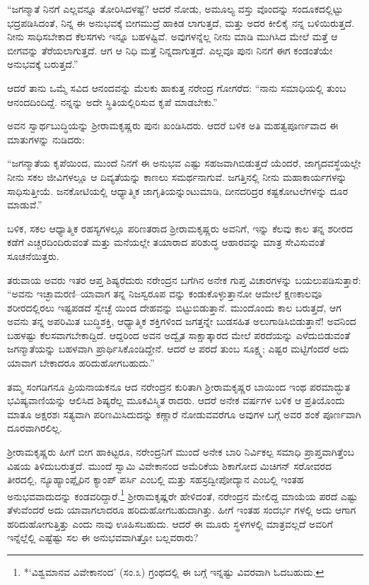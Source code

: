 “ಜಗನ್ಮಾತೆ ನಿನಗೆ ಎಲ್ಲವನ್ನೂ ತೋರಿಸಿದಳಷ್ಟೆ? ಆದರೆ ನೋಡು, ಅಮೂಲ್ಯ ವಸ್ತು ವೊಂದನ್ನು ಸಂದೂಕದಲ್ಲಿಟ್ಟು ಭದ್ರಪಡಿಸಿದಂತೆ, ನಿನ್ನ ಈ ಅನುಭವಕ್ಕೆ ಬೀಗಮುದ್ರೆ ಹಾಕಿಡ ಲಾಗುತ್ತದೆ, ಮತ್ತು ಅದರ ಕೀಲಿಕೈ ನನ್ನ ಬಳಿಯಿರುತ್ತದೆ. ನೀನು ಸಾಧಿಸಬೇಕಾದ ಕೆಲಸಗಳು ಇನ್ನೂ ಬಹಳಷ್ಟಿವೆ. ಅವುಗಳನ್ನೆಲ್ಲ ನೀನು ಮಾಡಿ ಮುಗಿಸಿದ ಮೇಲೆ ಮತ್ತೆ ಆ ಬೀಗವನ್ನು ತೆರೆಯಲಾಗುತ್ತದೆ. ಆಗ ಆ ನಿಧಿ ಮತ್ತೆ ನಿನ್ನದಾಗುತ್ತದೆ. ಎಲ್ಲವೂ ಪುನಃ ನಿನಗೆ ಈಗ ಕಂಡಂತೆಯೇ ಅನುಭವಕ್ಕೆ ಬರುತ್ತದೆ.”

ಆದರೆ ತಾನು ಒಮ್ಮೆ ಸವಿದ ಆನಂದವನ್ನು ಮೆಲಕು ಹಾಕುತ್ತ ನರೇಂದ್ರ ಗೋಗರೆದ: “ನಾನು ಸಮಾಧಿಯಲ್ಲಿ ತುಂಬ ಆನಂದದಿಂದಿದ್ದೆ. ನನ್ನನ್ನು ಅದೇ ಸ್ಥಿತಿಯಲ್ಲಿರಿಸುವ ಕೃಪೆ ಮಾಡಬೇಕು.”

ಅವನ ಸ್ವಾರ್ಥಬುದ್ಧಿಯನ್ನು ಶ್ರೀರಾಮಕೃಷ್ಣರು ಪುನಃ ಖಂಡಿಸಿದರು. ಆದರೆ ಬಳಿಕ ಅತಿ ಮಹತ್ವಪೂರ್ಣವಾದ ಈ ಮಾತುಗಳನ್ನು ನುಡಿದರು:

“ಜಗನ್ಮಾತೆಯ ಕೃಪೆಯಿಂದ, ಮುಂದೆ ನಿನಗೆ ಈ ಅನುಭವ ಎಷ್ಟು ಸಹಜವಾಗಿಬಿಡುತ್ತದೆ ಯೆಂದರೆ, ಜಾಗೃದವಸ್ಥೆಯಲ್ಲೇ ನೀನು ಸಕಲ ಜೀವಿಗಳಲ್ಲೂ ಆ ದಿವ್ಯತೆಯನ್ನು ಕಾಣಲು ಸಮರ್ಥನಾಗುವೆ. ಜಗತ್ತಿನಲ್ಲಿ ನೀನು ಮಹಾಕಾರ್ಯಗಳನ್ನು ಸಾಧಿಸುತ್ತೀಯೆ. ಜನಕೋಟಿಯಲ್ಲಿ ಆಧ್ಯಾತ್ಮಿಕ ಜಾಗೃತಿಯನ್ನುಂಟುಮಾಡಿ, ದೀನದರಿದ್ರರ ಕಷ್ಟಕೋಟಲೆಗಳನ್ನು ದೂರ ಮಾಡುವೆ.”

ಬಳಿಕ, ಸಕಲ ಆಧ್ಯಾತ್ಮಿಕ ರಹಸ್ಯಗಳಲ್ಲೂ ಪರಿಣತರಾದ ಶ್ರೀರಾಮಕೃಷ್ಣರು ಅವನಿಗೆ, ಇನ್ನು ಕೆಲವು ಕಾಲ ತನ್ನ ಶರೀರದ ಕಡೆಗೆ ಎಚ್ಚರದಿಂದಿರುವಂತೆ ಮತ್ತು ಮನೆಯಲ್ಲೇ ತಯಾರಾದ ಪರಿಶುದ್ಧ ಆಹಾರವನ್ನು ಮಾತ್ರ ಸೇವಿಸುವಂತೆ ಸೂಚನೆಯಿತ್ತರು.

ತರುವಾಯ ಅವರು ಇತರ ಆಪ್ತ ಶಿಷ್ಯರೆದುರು ನರೇಂದ್ರನ ಬಗೆಗಿನ ಅನೇಕ ಗುಪ್ತ ವಿಚಾರಗಳನ್ನು ಬಯಲುಪಡಿಸುತ್ತಾರೆ: “ಅವನು ಇಚ್ಛಾಮರಣಿ–ಯಾವಾಗ ತನ್ನ ನಿಜಸ್ವರೂಪ ವನ್ನು ಕಂಡುಕೊಳ್ಳುತ್ತಾನೋ ಆಮೇಲೆ ಕ್ಷಣಕಾಲವೂ ಶರೀರದಲ್ಲಿರಲು ಇಷ್ಟಪಡದೆ ಸ್ವೇಚ್ಛೆ ಯಿಂದ ದೇಹವನ್ನು ಬಿಟ್ಟುಬಿಡುತ್ತಾನೆ. ಮುಂದೊಂದು ಕಾಲ ಬರುತ್ತದೆ, ಆಗ ಅವನು ತನ್ನ ಅಪರಿಮಿತ ಬುದ್ಧಿಶಕ್ತಿ, ಆಧ್ಯಾತ್ಮಿಕ ಶಕ್ತಿಗಳಿಂದ ಜಗತ್ತನ್ನೇ ಬುಡಸಹಿತ ಅಲುಗಾಡಿಸಿಬಿಡುತ್ತಾನೆ! ಅವನಿಂದ ಬಹಳಷ್ಟು ಕೆಲಸವಾಗಬೇಕಾದ್ದಿದೆ. ಆದ್ದರಿಂದ ಅವನ ಅದ್ವೈತ ಸಾಕ್ಷಾತ್ಕಾರದ ಮೇಲೆ ಪರದೆಯನ್ನು ಎಳೆದುಬಿಡುವಂತೆ ಜಗನ್ಮಾತೆಯನ್ನು ಬಹಳವಾಗಿ ಪ್ರಾರ್ಥಿಸಿಕೊಂಡಿದ್ದೇನೆ. ಆದರೆ ಆ ಪರದೆ ತುಂಬ ಸೂಕ್ಷ್ಮ; ಎಷ್ಟರ ಮಟ್ಟಿಗೆಂದರೆ ಅದು ಯಾವಾಗ ಬೇಕಾದರೂ ಹರಿದುಹೋಗಬಹುದು.”

ತಮ್ಮ ಸಂಗಡಿಗನೂ ಪ್ರಿಯನಾಯಕನೂ ಆದ ನರೇಂದ್ರನ ಕುರಿತಾಗಿ ಶ್ರೀರಾಮಕೃಷ್ಣರ ಬಾಯಿಂದ ಇಂಥ ಪರಮಾದ್ಭುತ ಭವಿಷ್ಯವಾಣಿಯನ್ನು ಆಲಿಸಿದ ಶಿಷ್ಯರೆಲ್ಲ ಮೂಕವಿಸ್ಮಿತ ರಾದರು. ಆದರೆ ಅನೇಕ ವರ್ಷಗಳ ಬಳಿಕ ಆ ಪ್ರತಿಯೊಂದು ಮಾತೂ ಅಕ್ಷರಶಃ ಸತ್ಯವಾಗಿ ಪರಿಣಮಿಸಿದುದನ್ನು ಕಣ್ಣಾರೆ ನೋಡುವವರೆಗೂ ಅವುಗಳ ಬಗ್ಗೆ ಅವರ ಶಂಕೆ ಪೂರ್ಣವಾಗಿ ದೂರವಾಗಿರಲಿಲ್ಲ.

ಶ್ರೀರಾಮಕೃಷ್ಣರು ಹೀಗೆ ಬೀಗ ಹಾಕಿಟ್ಟರೂ, ನರೇಂದ್ರನಿಗೆ ಮುಂದೆ ಅನೇಕ ಬಾರಿ ನಿರ್ವಿಕಲ್ಪ ಸಮಾಧಿ ಪ್ರಾಪ್ತವಾಗಿತ್ತೆಂಬ ವಿಷಯ ತಿಳಿದುಬರುತ್ತದೆ. ಮುಂದೆ ಸ್ವಾಮಿ ವಿವೇಕಾನಂದ ಅಮೆರಿಕೆಯ ಶಿಕಾಗೋದ ಮಿಚಿಗನ್ ಸರೋವರದ ತೀರದಲ್ಲಿ, ನ್ಯೂಹ್ಯಾಂಪ್ಷೈರಿನ ಕ್ಯಾಂಪ್ ಪರ್ಸಿ ಎಂಬಲ್ಲಿ ಮತ್ತು ಸಹಸ್ರದ್ವೀಪೋದ್ಯಾನ ಎಂಬಲ್ಲಿ ಇಂತಹ ಅನುಭವವಾದುದನ್ನು ಕಂಡವರಿದ್ದಾರೆ.\footnote{*`ವಿಶ್ವಮಾನವ ವಿವೇಕಾನಂದ' (ಸಂ.೩) ಗ್ರಂಥದಲ್ಲಿ ಈ ಬಗ್ಗೆ ಇನ್ನಷ್ಟು ವಿವರವಾಗಿ ಓದಬಹುದು.} ಶ್ರೀರಾಮಕೃಷ್ಣರೇ ಹೇಳಿದಂತೆ, ನರೇಂದ್ರನ ಮೇಲಿದ್ದ ಮಾಯೆಯ ಪರದೆ ಎಷ್ಟು ತೆಳುವೆಂದರೆ ಅದು ಯಾವಾಗಲಾದರೂ ಹರಿದುಹೋಗಬಹುದಾಗಿತ್ತು. ಹೀಗೆ ಇಂತಹ ಸಂದರ್ಭ ಗಳಲ್ಲಿ ಅದು ಆಗಾಗ ಹರಿದುಹೋಗುತ್ತಿತ್ತು ಎಂದು ನಾವು ಊಹಿಸಬಹುದು. ಆದರೆ ಈ ಮೂರು ಸ್ಥಳಗಳಲ್ಲಿ ಮಾತ್ರವಲ್ಲದೆ ಅವರಿಗೆ ಇನ್ನೆಲ್ಲೆಲ್ಲಿ ಎಷ್ಟೆಷ್ಟು ಸಲ ಈ ಅನುಭವವಾಗಿತ್ತೋ ಬಲ್ಲವರಾರು?

